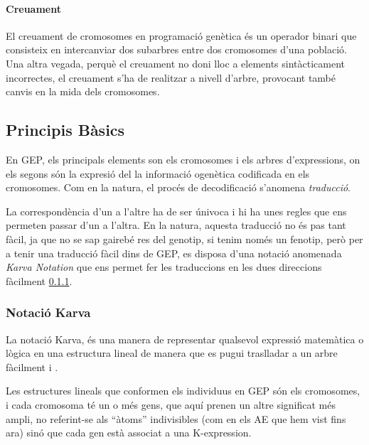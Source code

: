 \paragraph{Creuament} %
\label{par:Creuament}
El creuament de cromosomes en programació genètica és un operador binari que
consisteix en intercanviar dos subarbres entre dos cromosomes d'una població.
Una altra vegada, perquè el creuament no doni lloc a elements sintàcticament
incorrectes, el creuament s'ha de realitzar a nivell d'arbre, provocant també
canvis en la mida dels cromosomes.



\subsection{Principis Bàsics} %
\label{sub:Principis Basics}

En GEP, els principals elements son els cromosomes i els arbres d'expressions,
on els segons són la expresió del la informació ogenètica codificada en els
cromosomes.  Com en la natura, el procés de decodificació s'anomena
\emph{traducció}.

La correspondència d'un a l'altre ha de ser únivoca i hi ha unes regles que ens
permeten passar d'un a l'altra.  En la natura, aquesta traducció no és pas tant
fàcil, ja que no se sap gairebé res del genotip, si tenim només un fenotip, però
per a tenir una traducció fàcil dins de GEP, es disposa d'una notació anomenada
\emph{Karva Notation} que ens permet fer les traduccions en les dues direccions
fàcilment \ref{ssub:Notacio Karva}.



\subsubsection{Notació Karva} %
\label{ssub:Notacio Karva}

La notació Karva, és una manera de representar qualsevol expressió matemàtica o
lògica en una estructura lineal de manera que es pugui traslladar a un arbre
fàcilment \cite{ferreira:2001} i \cite{ferreira:2006}.

Les estructures lineals que conformen els individuus en GEP són els cromosomes,
i cada cromosoma té un o més gens, que aquí prenen un altre significat més
ampli, no referint-se als ``àtoms'' indivisibles (com en els AE que hem vist
fins ara) sinó que cada gen està associat a una K-expression.
\cite{ferreira:2007}

